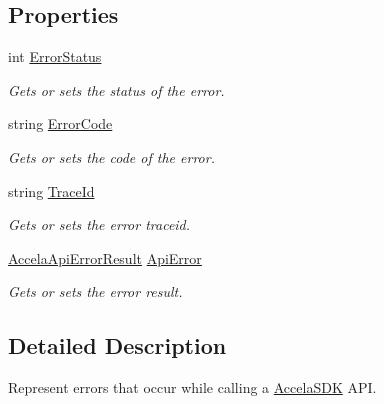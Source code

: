 \subsection*{Properties}
\begin{DoxyCompactItemize}
\item 
int \hyperlink{class_accela_1_1_windows_store_s_d_k_1_1_accela_api_exception_a509a2e7a1e0dea362c6778e9163aaa39}{Error\+Status}
\begin{DoxyCompactList}\small\item\em Gets or sets the status of the error. \end{DoxyCompactList}\item 
string \hyperlink{class_accela_1_1_windows_store_s_d_k_1_1_accela_api_exception_a0a0211f959f5f7c3a2c481f6ab12fa69}{Error\+Code}
\begin{DoxyCompactList}\small\item\em Gets or sets the code of the error. \end{DoxyCompactList}\item 
string \hyperlink{class_accela_1_1_windows_store_s_d_k_1_1_accela_api_exception_ab6ac5f7216b4cefa84354ecdf082f5db}{Trace\+Id}
\begin{DoxyCompactList}\small\item\em Gets or sets the error traceid. \end{DoxyCompactList}\item 
\hyperlink{class_accela_1_1_windows_store_s_d_k_1_1_accela_api_error_result}{Accela\+Api\+Error\+Result} \hyperlink{class_accela_1_1_windows_store_s_d_k_1_1_accela_api_exception_ab4544f843869a3b550f66bd8a9f989b6}{Api\+Error}
\begin{DoxyCompactList}\small\item\em Gets or sets the error result. \end{DoxyCompactList}\end{DoxyCompactItemize}


\subsection{Detailed Description}
Represent errors that occur while calling a \hyperlink{class_accela_1_1_windows_store_s_d_k_1_1_accela_s_d_k}{Accela\+S\+D\+K} A\+P\+I. 



